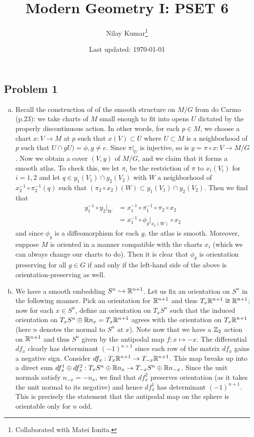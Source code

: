 \documentclass{../mathnotes}
\title{Modern Geometry I: PSET 6}
\author{Nilay Kumar\footnote{Collaborated with Matei Ionita.}}
\date{Last updated: \today}
\begin{document}
\maketitle

\subsection*{Problem 1}
\begin{enumerate}[(a)]
    \item Recall the construction of of the smooth structure on $M/G$ from do Carmo (p.23): we take
        charts of $M$ small enough to fit into opens $U$ dictated by the properly discontinuous
        action. In other words, for each $p\in M$, we choose a chart $x:V\to M$ at $p$ such that
        $x(V)\subset U$ where $U\subset M$ is a neighborhood of $p$ such that $U\cap gU)=\phi, g\neq e$.
        Since $\pi|_U$ is injective, so is $y=\pi\circ x:V\to M/G$. Now we obtain a cover $(V,y)$ of $M/G$,
        and we claim that it forms a smooth atlas. To check this, we let $\pi_i$ be the restriction
        of $\pi$ to $x_i(V_i)$ for $i=1,2$ and let $q\in y_1(V_1)\cap y_2(V_2)$ 
        with $W$ a neighborhood of $x_2^{-1}\circ\pi_2^{-1}(q)$ such that $(\pi_2\circ x_2)(W)\subset y_1(V_1)\cap y_2(V_2)$.
        Then we find that
        \begin{align*}
            y_1^{-1}\circ y_2|_W &= x_1^{-1}\circ \pi_1^{-1}\circ \pi_2\circ x_2\\
            &= x_1^{-1}\circ \phi_g|_{x_2(W)}\circ x_2
        \end{align*}
        and since $\phi_g$ is a diffeomorphism for each $g$, the atlas is smooth. Moreover, suppose $M$
        is oriented in a manner compatible with the charts $x_i$ (which we can always change our charts to do).
        Then it is clear that $\phi_g$ is orientation preserving for all $g\in G$ if and only if the left-hand side of
        the above is orientation-preserving as well.
    \item We have a smooth embedding $S^n\hookrightarrow \mathbb{R}^{n+1}$. Let us fix an orientation on $S^n$ in
        the following manner. Pick an orientation for $\mathbb{R}^{n+1}$ and thus $T_x\mathbb{R}^{n+1}\cong\mathbb{R}^{n+1}$;
        now for each $x\in S^n$, define an orientation on $T_xS^n$ such that the induced orientation on
        $T_xS^n\oplus\mathbb{R} n_x=T_x\mathbb{R}^{n+1}$ agrees with the orientation on $T_x\mathbb{R}^{n+1}$ (here $n$ denotes the
        normal to $S^n$ at $x$). Note now that we have a $\mathbb{Z}_2$ action on $\mathbb{R}^{n+1}$ and thus $S^n$ given
        by the antipodal map $f:x\mapsto -x$. The differential $df_x$ clearly has determinant $(-1)^{n+1}$
        since each row of the matrix $df_x$ gains a negative sign. Consider $df_x:T_x\mathbb{R}^{n+1}\to T_{-x}\mathbb{R}^{n+1}$.
        This map breaks up into a direct sum $df^1_x\oplus df^2_x:T_xS^n\oplus \mathbb{R} n_x\to T_{-x}S^n\oplus \mathbb{R} n_{-x}$.
        Since the unit normals satisfy $n_{-x}=-n_x$, we find that $df^2_x$ preserves orientation (as it takes
        the unit normal to its negative) and hence $df^1_x$ has determinant $(-1)^{n+1}$. This is
        precisely the statement that the antipodal map on the sphere is orientable only for $n$ odd.


\end{enumerate}
\end{document}
